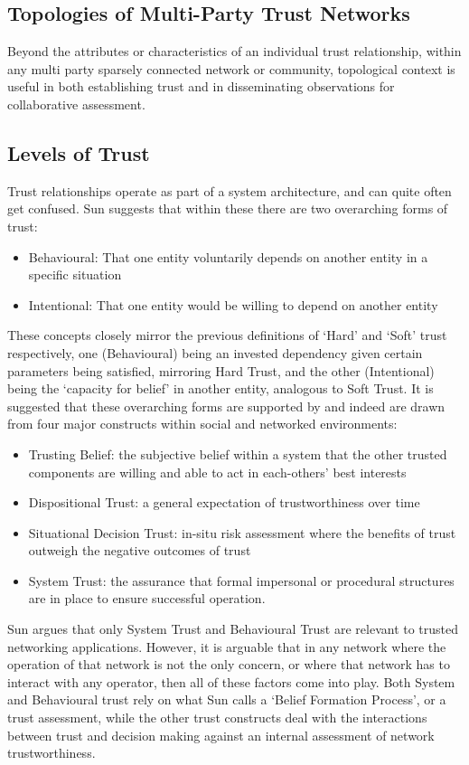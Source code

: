 \subsection{Topologies of Multi-Party Trust Networks}
\label{sec:trust_topologies}
Beyond the attributes or characteristics of an individual trust relationship, within any multi party sparsely connected network or community, topological context is useful in both establishing trust and in disseminating observations for collaborative assessment.



\subsection{Levels of Trust}
Trust relationships operate as part of a system architecture, and can quite often get confused.
Sun\cite{Sun2008} suggests that within these there are two overarching forms of trust:
\begin{itemize}
  \item Behavioural: That one entity voluntarily depends on another entity in a specific situation
  \item Intentional: That one entity would be willing to depend on another entity
\end{itemize}
These concepts closely mirror the previous definitions of ‘Hard’ and ‘Soft’ trust respectively, one (Behavioural) being an invested dependency given certain parameters being satisfied, mirroring Hard Trust, and the other (Intentional) being the ‘capacity for belief’ in another entity, analogous to Soft Trust.
It is suggested that these overarching forms are supported by and indeed are drawn from four major constructs within social and networked environments:
\begin{itemize}
  \item Trusting Belief: the subjective belief within a system that the other trusted components are willing and able to act in each-others’ best interests
  \item Dispositional Trust: a general expectation of trustworthiness over time 
  \item Situational Decision Trust: in-situ risk assessment where the benefits of trust outweigh the negative outcomes of trust
  \item System Trust: the assurance that formal impersonal or procedural structures are in place to ensure successful operation.
\end{itemize}
Sun argues that only System Trust and Behavioural Trust are relevant to trusted networking applications.
However, it is arguable that in any network where the operation of that network is not the only concern, or where that network has to interact with any operator, then all of these factors come into play.
Both System and Behavioural trust rely on what Sun calls a ‘Belief Formation Process’, or a trust assessment, while the other trust constructs deal with the interactions between trust and decision making against an internal assessment of network trustworthiness.

